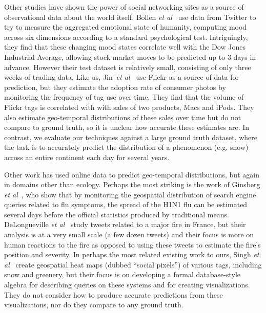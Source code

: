 Other studies have shown the power of social networking sites as a
source of observational data about the world itself.  Bollen
\textit{et al}~\cite{bollen11twitter} use data from Twitter to try to measure
the aggregated emotional state of humanity, computing mood across six
dimensions according to a standard psychological
test. Intriguingly, they find that these changing mood states
correlate well with the Dow Jones Industrial Average, allowing stock
market moves to be predicted up to 3 days in advance.  However their
test dataset is relatively small, consisting of only three weeks of
trading data.  Like us, Jin~\textit{et al}~\cite{jin10prediction} use
Flickr as a source of data for prediction, but they estimate the
adoption rate of consumer photos by monitoring the frequency of tag
use over time. They find that the volume of Flickr tags is 
correlated  with with sales of two products, Macs and iPods. They also
estimate geo-temporal distributions of these sales over time but do
not compare to ground truth, so it is unclear how accurate these
estimates are. In contrast, we evaluate our techniques against a large
ground truth dataset, where the task is to accurately predict the
distribution of a phenomenon (e.g. snow) across an entire continent 
each day for several years.

Other work has used online data to predict geo-temporal distributions,
but again in domains other than ecology.  Perhaps the most
striking is the work of Ginsberg \textit{et al}~\cite{ginsberg09flu},
who show that by monitoring the geospatial distribution of search
engine queries related to flu symptoms, the spread of the H1N1
flu can be estimated several days before the official statistics produced by traditional
means.
DeLongueville \textit{et
  al}~\cite{delongueville09} study tweets related to a major fire in
France, but their analysis is at a very small scale (a few dozen
tweets) and their focus is more on human reactions to the fire as
opposed to using these tweets to estimate the fire's position and
severity.  In perhaps the most related existing work to ours,
 Singh \textit{et al}~\cite{singh10socialpixels} create
geospatial heat maps (dubbed ``social pixels'') of various
tags, including snow and greenery, but their focus is on developing a
formal database-style algebra for describing queries on these systems
and for creating visualizations. They do not consider how to produce
accurate predictions from these visualizations, nor do they compare to
any ground truth.

